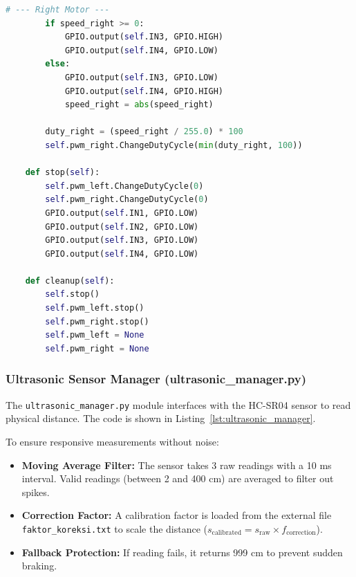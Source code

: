 \begin{lstlisting}[language=Python, caption={Motor Driver Control Module (motor\_manager.py)}, label={lst:motor_manager}]
        # --- Right Motor ---
        if speed_right >= 0:
            GPIO.output(self.IN3, GPIO.HIGH)
            GPIO.output(self.IN4, GPIO.LOW)
        else:
            GPIO.output(self.IN3, GPIO.LOW)
            GPIO.output(self.IN4, GPIO.HIGH)
            speed_right = abs(speed_right)
            
        duty_right = (speed_right / 255.0) * 100
        self.pwm_right.ChangeDutyCycle(min(duty_right, 100))

    def stop(self):
        self.pwm_left.ChangeDutyCycle(0)
        self.pwm_right.ChangeDutyCycle(0)
        GPIO.output(self.IN1, GPIO.LOW)
        GPIO.output(self.IN2, GPIO.LOW)
        GPIO.output(self.IN3, GPIO.LOW)
        GPIO.output(self.IN4, GPIO.LOW)

    def cleanup(self):
        self.stop()
        self.pwm_left.stop()
        self.pwm_right.stop()
        self.pwm_left = None
        self.pwm_right = None
\end{lstlisting}

\subsubsection{Ultrasonic Sensor Manager (ultrasonic\_manager.py)}
The \texttt{ultrasonic\_}\allowbreak\texttt{manager.py} module interfaces with the HC-SR04 sensor to read physical distance. The code is shown in Listing~\ref{lst:ultrasonic_manager}.

To ensure responsive measurements without noise:
\begin{itemize}
    \item \textbf{Moving Average Filter:} The sensor takes 3 raw readings with a 10 ms interval. Valid readings (between 2 and 400 cm) are averaged to filter out spikes.
    \item \textbf{Correction Factor:} A calibration factor is loaded from the external file \texttt{faktor\_}\allowbreak\texttt{koreksi.txt} to scale the distance ($s_{\text{calibrated}} = s_{\text{raw}} \times f_{\text{correction}}$).
    \item \textbf{Fallback Protection:} If reading fails, it returns 999 cm to prevent sudden braking.
\end{itemize}

